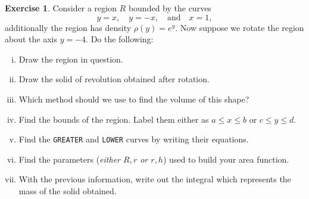 \documentclass[12pt]{article}
\theoremstyle{plain}
\theoremstyle{definition}
\newtheorem{Ej}[Th]{Exercise}         %
\theoremstyle{remark}
\renewcommand{\leq}{\leqslant}      %
\renewcommand{\:}{\colon}           %
\renewcommand{\.}{\Cdot}                %
\begin{document}

\begin{Ej}
 Consider a region $R$ bounded by the curves
 $$y=x,\quad y=-x,\quad\text{and}\quad x=1,$$
 additionally the region has density $\rho(y)=e^y$. Now suppose we rotate the region about the axis $y=-4$. Do the following:
  \begin{enumerate}[i)]
    \itemsep=-0.4em
    \item Draw the region in question.
    \item Draw the solid of revolution obtained after rotation.
    \item Which method should we use to find the volume of this shape?
    \item Find the bounds of the region. Label them either as $a\leq x\leq b$ or $c\leq y\leq d$.
    \item Find the \texttt{GREATER} and \texttt{LOWER} curves by writing their equations.
    \item Find the parameters (\emph{either $R,r$ or $r,h$}) used to build your area function. 
    \item With the previous information, write out the integral which represents the mass of the solid obtained.
  \end{enumerate}
\end{Ej}
\end{document}

